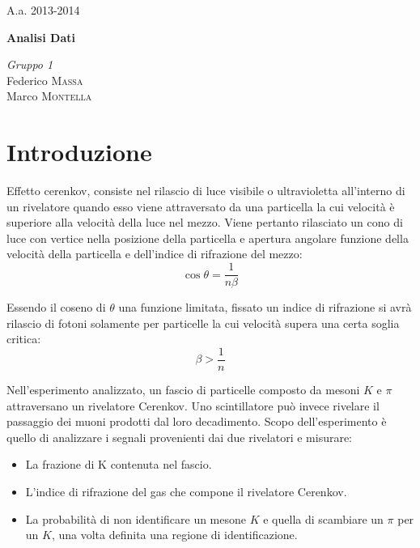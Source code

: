 \documentclass[8pt]{extarticle}
\begin{document}
\justify
\printindex
\Large{A.a. 2013-2014}
\vspace{10cm}
\begin{center}
\Huge\textbf{Analisi Dati}
\end{center}

\vspace{2cm}
\begin{flushleft}
\textit{Gruppo \textsc{1}} \\
\medskip
Federico \textsc{Massa} \\ 
Marco \textsc{Montella}
\end{flushleft}



\newpage

\begin{abstract}
\justify
 

\end{abstract}
\bigskip

\section{Introduzione} \label{sec:intro}
Effetto cerenkov, consiste nel rilascio di luce visibile o ultravioletta all'interno di un rivelatore quando esso viene attraversato da una
particella la cui velocità è superiore alla velocità della luce nel mezzo.
Viene pertanto rilasciato un cono di luce con vertice nella posizione della particella e apertura angolare funzione della velocità della particella
e dell'indice di rifrazione del mezzo: \\
\begin{equation} \label{eq:cerenkov}
\cos{\theta}=\frac{1}{n \beta}
\end{equation}

Essendo il coseno di $\theta$ una funzione limitata, fissato un indice di rifrazione si avrà rilascio di fotoni solamente per particelle la cui velocità supera una certa soglia critica: \\
\begin{equation}
\beta > \frac{1}{n}
\end{equation}

Nell'esperimento analizzato, un fascio di particelle composto da mesoni $K$ e $\pi$ attraversano un rivelatore Cerenkov. Uno scintillatore può invece rivelare il passaggio dei muoni prodotti dal loro decadimento. Scopo dell'esperimento è quello di analizzare i segnali provenienti dai due rivelatori e misurare: \\
\begin{itemize}
\item La frazione di K contenuta nel fascio.
\item L'indice di rifrazione del gas che compone il rivelatore Cerenkov.
\item La probabilità di non identificare un mesone $K$ e quella di scambiare un $\pi$ per un $K$, una volta definita una regione di identificazione.
\end{itemize}
\end{document}
